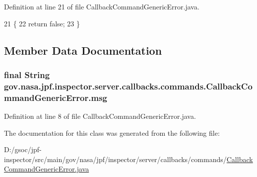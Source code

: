 Definition at line 21 of file Callback\+Command\+Generic\+Error.\+java.


\begin{DoxyCode}
21                                  \{
22     \textcolor{keywordflow}{return} \textcolor{keyword}{false};
23   \}
\end{DoxyCode}


\subsection{Member Data Documentation}
\subsubsection[{\texorpdfstring{msg}{msg}}]{\setlength{\rightskip}{0pt plus 5cm}final String gov.\+nasa.\+jpf.\+inspector.\+server.\+callbacks.\+commands.\+Callback\+Command\+Generic\+Error.\+msg\hspace{0.3cm}{\ttfamily [private]}}\hypertarget{classgov_1_1nasa_1_1jpf_1_1inspector_1_1server_1_1callbacks_1_1commands_1_1_callback_command_generic_error_aba334d1e5362cadb4690711c7bab4acc}{}\label{classgov_1_1nasa_1_1jpf_1_1inspector_1_1server_1_1callbacks_1_1commands_1_1_callback_command_generic_error_aba334d1e5362cadb4690711c7bab4acc}


Definition at line 8 of file Callback\+Command\+Generic\+Error.\+java.



The documentation for this class was generated from the following file\+:\begin{DoxyCompactItemize}
\item 
D\+:/gsoc/jpf-\/inspector/src/main/gov/nasa/jpf/inspector/server/callbacks/commands/\hyperlink{_callback_command_generic_error_8java}{Callback\+Command\+Generic\+Error.\+java}\end{DoxyCompactItemize}
